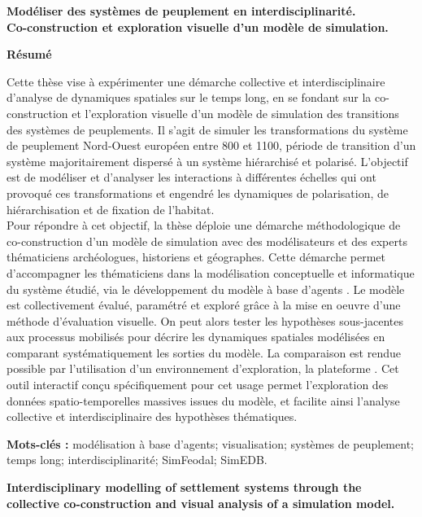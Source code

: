\pagestyle{empty}
{\large\textbf{Modéliser des systèmes de peuplement en interdisciplinarité.\\ Co-construction et exploration visuelle d'un modèle de simulation.}}

\textbf{Résumé}

\vspace*{-0.5em}
Cette thèse vise à expérimenter une démarche collective et interdisciplinaire d'analyse de dynamiques spatiales sur le temps long, en se fondant sur la co-construction et l'exploration visuelle d'un modèle de simulation des transitions des systèmes de peuplements.
Il s'agit de simuler les transformations du système de peuplement Nord-Ouest européen entre 800 et 1100, période de transition d'un système majoritairement dispersé à un système hiérarchisé et polarisé.
L'objectif est de modéliser et d'analyser les interactions à différentes échelles qui ont provoqué ces transformations et engendré les dynamiques de polarisation, de hiérarchisation et de fixation de l'habitat.\\
Pour répondre à cet objectif, la thèse déploie une démarche méthodologique de co-construction d'un modèle de simulation avec des modélisateurs et des experts thématiciens archéologues, historiens et géographes.
Cette démarche permet d'accompagner les thématiciens dans la modélisation conceptuelle et informatique du système étudié, via le développement du modèle à base d'agents \simfeodal{}.
Le modèle est collectivement évalué, paramétré et exploré grâce à la mise en oeuvre d'une méthode d'évaluation visuelle.
On peut alors tester les hypothèses sous-jacentes aux processus mobilisés pour décrire les dynamiques spatiales modélisées en comparant systématiquement les sorties du modèle.
La comparaison est rendue possible par l'utilisation d'un environnement d'exploration, la plateforme \simedb{}.
Cet outil interactif conçu spécifiquement pour cet usage permet l'exploration des données spatio-temporelles massives issues du modèle, et facilite ainsi l'analyse collective et interdisciplinaire des hypothèses thématiques.

\textbf{Mots-clés :} 
modélisation à base d'agents; visualisation; systèmes de peuplement; temps long; interdisciplinarité; SimFeodal; SimEDB.

\vspace{1.2em}
{\large\textbf{Interdisciplinary modelling of settlement systems through the collective co-construction and visual analysis of a simulation model.}}

